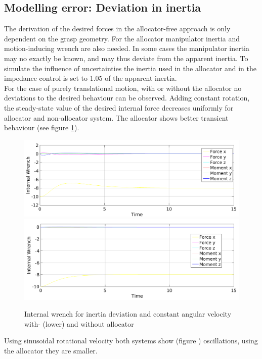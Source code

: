 \documentclass[conference]{IEEEtran}
\begin{document}
\subsection{Modelling error: Deviation in inertia}
The derivation of the desired forces in the allocator-free approach is only dependent on the grasp geometry. For the allocator manipulator inertia and motion-inducing wrench are also needed. In some cases the manipulator inertia may no exactly be known, and may thus deviate from the apparent inertia. To simulate the influence of uncertainties the inertia used in the allocator and in the impedance control is set to 1.05 of the apparent inertia.\\
For the case of purely translational motion, with or without the allocator no deviations to the desired behaviour can be observed.
Adding constant rotation, the steady-state value of the desired internal force decreases uniformly for allocator and non-allocator system. The allocator shows better transient behaviour (see figure \ref{IntDevPT1}).
\begin{figure}
\includegraphics[width=\linewidth]{IntDevNullPT1}
\includegraphics[width=\linewidth]{IntDevAlloPT1}
\caption{Internal wrench for inertia deviation and constant angular velocity with- (lower) and without allocator}
\label{IntDevPT1}
\end{figure}
Using sinusoidal rotational velocity both systems show (figure ) oscillations, using the allocator they are smaller.
\end{document}

